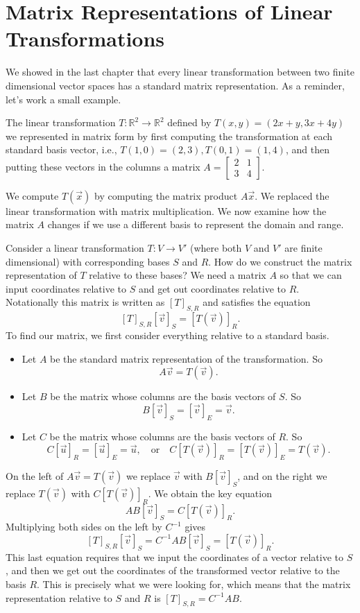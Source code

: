 \section{Matrix Representations of Linear Transformations}
We showed in the last chapter that every linear transformation between two finite dimensional vector spaces has a standard matrix representation.  As a reminder, let's work a small example.
\begin{example}
The linear transformation $T\colon {\mathbb{R}}^2 \to {\mathbb{R}}^2$ defined by $T(x,y)=(2x+y,3x+4y)$ we represented in matrix form by first computing the transformation at each standard basis vector, i.e., $T(1,0)=(2,3), T(0,1)=(1,4)$, and then putting these vectors in the columns a matrix 
$A= \begin{bmatrix}2&1\\3&4\end{bmatrix}$. 
\end{example}
We compute $T(\vec x)$ by computing the matrix product $A\vec x$.  We replaced the linear transformation with matrix multiplication. We now examine how the matrix $A$ changes if we use a different basis to represent the domain and range.

Consider a linear transformation $T\colon V \to V'$ (where both $V$ and $V'$ are finite dimensional) with corresponding bases $S$ and $R$. 
How do we construct the matrix representation of $T$ relative to these bases?  
We need a matrix $A$ so that we can input coordinates relative to $S$ and get out coordinates relative to $R$.  
Notationally this matrix is written as $[T]_{S,R}$ and satisfies the equation $$[T]_{S,R}[\vec v]_S=[T(\vec v)]_{R}.$$ 
To find our matrix, we first consider everything relative to a standard basis. 
\begin{itemize}
	\item Let $A$ be the standard matrix representation of the transformation. So $$A\vec v = T(\vec v).$$
	\item Let $B$ be the matrix whose columns are the basis vectors of $S$. So $$B[\vec v]_S=[\vec v]_E=\vec v.$$
	\item Let $C$ be the matrix whose columns are the basis vectors of $R$. So $$C[\vec u]_{R}=[\vec u]_E=\vec u, \quad \text{or}\quad C[T(\vec v)]_{R}=[T(\vec v)]_E=T(\vec v).$$
\end{itemize}
On the left of $A\vec v = T(\vec v)$ we replace $\vec v$ with $B[\vec v]_S$, and on the right we replace $T(\vec v)$ with $C[T(\vec v)]_{R}$. We obtain the key equation 
$$AB[\vec v]_S=C[T(\vec v)]_{R}.$$
Multiplying both sides on the left by $C^{-1}$ gives $$[T]_{S,R}[\vec v]_S=C^{-1}AB[\vec v]_S=[T(\vec v)]_{R}.$$ This last equation requires that we input the coordinates of a vector relative to $S$, and then we get out the coordinates of the transformed vector relative to the basis $R$. This is precisely what we were looking for, which means that the matrix representation relative to $S$ and $R$ is $[T]_{S,R} = C^{-1}AB$.

